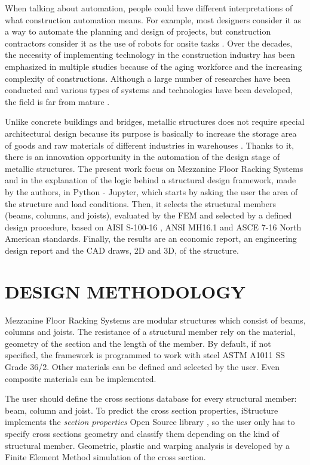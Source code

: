 \documentclass[twocolumn,10pt]{asme2e}
\begin{document}
When talking about automation, people could have different interpretations of what construction automation means. For example, most designers consider it as a way to automate the planning and design of projects, but construction contractors consider it as the use of robots for onsite tasks \cite{CHEN201822}. Over the decades, the necessity of implementing technology in the construction industry has been emphasized in multiple studies because of the aging workforce and the increasing complexity of constructions. Although a large number of researches have been conducted and various types of systems and technologies have been developed, the field is far from mature \cite{CAI2019100989, BOCK2015113}. 

Unlike concrete buildings and bridges, metallic structures does not require special architectural design because its purpose is basically to increase the storage area of goods and raw materials of different industries in warehouses \cite{YIN201972, 10.22260/ISARC2000/0031}. Thanks to it, there is an innovation opportunity in the automation of the design stage of metallic structures. The present work focus on Mezzanine Floor Racking Systems and in the explanation of the logic behind a structural design framework, made by the authors, in Python - Jupyter, which starts by asking the user the area of the structure and load conditions. Then, it selects the structural members (beams, columns, and joists), evaluated by the FEM and selected by a defined design procedure, based on AISI S-100-16 \cite{S100}, ANSI MH16.1 \cite{MH16.1} and ASCE 7-16 \cite{ASCE} North American standards. Finally, the results are an economic report, an engineering design report and the CAD draws, 2D and 3D, of the structure.

\section*{DESIGN METHODOLOGY}

Mezzanine Floor Racking Systems are modular structures which consist of beams, columns and joists. The resistance of a structural member rely on the material, geometry of the section and the length of the member. By default, if not specified, the framework is programmed to work with steel ASTM A1011 SS Grade 36/2. Other materials can be defined and selected by the user. Even composite materials can be implemented.

The user should define the cross sections database for every structural member: beam, column and joist. To predict the cross section properties, iStructure implements the \textit{section properties} Open Source library \cite{sectionproperties}, so the user only has to specify cross sections geometry and classify them depending on the kind of structural member. Geometric, plastic and warping analysis is developed by a Finite Element Method simulation of the cross section. 
\end{document}

